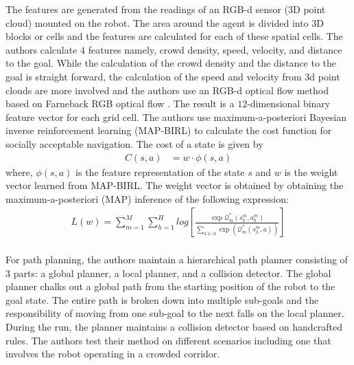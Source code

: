 The features are generated from the readings of an RGB-d sensor ($3$D point cloud) mounted on the robot. The area around the agent is divided into $3$D blocks or cells and the features are calculated for each of these spatial cells. 
The authors calculate $4$ features namely,
crowd density, speed, velocity, and distance to the goal.
While the calculation of the crowd density and the distance to the goal is straight forward, the calculation of the speed and velocity from 3d point clouds are more involved and the authors use an RGB-d optical flow method based on Farneback RGB optical flow \cite{farneback_optical_flow}. 
The result is a $12$-dimensional binary feature vector for each grid cell.
The authors use maximum-a-posteriori Bayesian inverse reinforcement learning (MAP-BIRL) \cite{choi_MAP-BIRL_2011} to calculate the cost function for socially acceptable navigation. The cost of a state is given by
\begin{align}
C(s,a) &=w \cdot \phi(s,a)
\end{align}
where, $\phi(s,a)$ is the feature representation of the state $s$ and $w$ is the weight vector learned from MAP-BIRL. 
The weight vector is obtained by obtaining the maximum-a-posteriori (MAP) inference of the following expression:
\begin{align}
L(w) = \sum^M_{m=1} \sum^{H}_{h=1}log[\frac{\exp \mathcal{Q}^{*}_m(s^m_h, a^m_h)}{\sum_{a\in A} \exp(\mathcal{Q}_m^*(s_h^m,a))}]
\end{align}
\\ 
For path planning, the authors maintain a hierarchical path planner consisting of 3 parts: a global planner, a local planner, and a collision detector.
The global planner chalks out a global path from the starting position of the robot to the goal state. The entire path is broken down into multiple sub-goals and the responsibility of moving from one sub-goal to the next falls on the local planner. During the run, the planner maintains a collision detector based on handcrafted rules.
The authors test their method on different scenarios including one that involves the robot operating in a crowded corridor.\\


